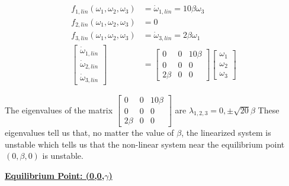 \documentclass{article}
\begin{document}
  \begin{align*}
    f_{1, lin}(\omega_1,\omega_2, \omega_3) &= \dot{\omega}_{1,lin} = 10\beta\omega_3 \\
    f_{2, lin}(\omega_1,\omega_2, \omega_3) &= 0 \\
    f_{3, lin}(\omega_1,\omega_2, \omega_3) &= \dot{\omega}_{3,lin} = 2\beta\omega_1 \\
    \begin{bmatrix}
      \dot{\omega}_{1,lin} \\
      \dot{\omega}_{2,lin} \\
      \dot{\omega}_{3,lin}
    \end{bmatrix} &=
    \begin{bmatrix}
      0 & 0 & 10\beta \\
      0 & 0 & 0 \\
      2\beta & 0 & 0
    \end{bmatrix}
    \begin{bmatrix}
      \omega_1 \\
      \omega_2 \\
      \omega_3
    \end{bmatrix}
  \end{align*}
    
  \noindent The eigenvalues of the matrix 
  $\begin{bmatrix}
      0 & 0 & 10\beta \\
      0 & 0 & 0 \\
      2\beta & 0 & 0
  \end{bmatrix}$
  are $\lambda_{1,2,3} = 0, \pm \sqrt{20}\beta$ \vspace{3.0mm}
  These eigenvalues tell us that, no matter the value of $\beta$, the linearized system is unstable
  which tells us that the non-linear system near the equilibrium point $(0,
  \beta, 0)$ is unstable. \newline \newline
    

  \textbf{\underline{Equilibrium Point: (0,\hspace{0.8mm}0,\hspace{0.8mm}$\gamma$)}}
\end{document}
